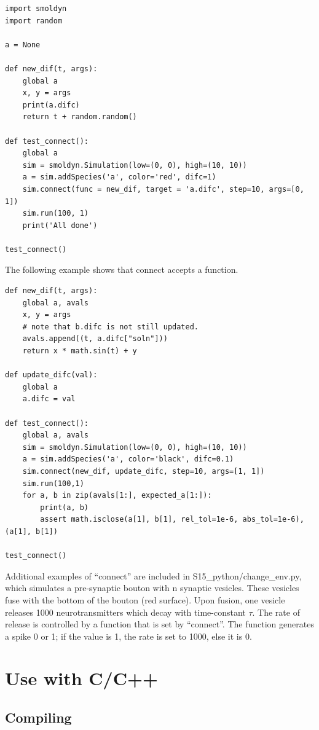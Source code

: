 \documentclass {scrbook}
\begin{document}
\begin{lstlisting}[style=SSAPython]
import smoldyn
import random

a = None

def new_dif(t, args):
    global a
    x, y = args
    print(a.difc)
    return t + random.random()

def test_connect():
    global a
    sim = smoldyn.Simulation(low=(0, 0), high=(10, 10))
    a = sim.addSpecies('a', color='red', difc=1)
    sim.connect(func = new_dif, target = 'a.difc', step=10, args=[0, 1])
    sim.run(100, 1)
    print('All done')

test_connect()
\end{lstlisting}

The following example shows that connect accepts a function.

\begin{lstlisting}[style=SSAPython]
def new_dif(t, args):
    global a, avals
    x, y = args
    # note that b.difc is not still updated.
    avals.append((t, a.difc["soln"]))
    return x * math.sin(t) + y

def update_difc(val):
    global a
    a.difc = val

def test_connect():
    global a, avals
    sim = smoldyn.Simulation(low=(0, 0), high=(10, 10))
    a = sim.addSpecies('a', color='black', difc=0.1)
    sim.connect(new_dif, update_difc, step=10, args=[1, 1])
    sim.run(100,1)
    for a, b in zip(avals[1:], expected_a[1:]):
        print(a, b)
        assert math.isclose(a[1], b[1], rel_tol=1e-6, abs_tol=1e-6), (a[1], b[1])

test_connect()
\end{lstlisting}

Additional examples of ``connect'' are included in S15\_python/change\_env.py, which simulates a pre-synaptic bouton with n synaptic vesicles. These vesicles fuse with the bottom of the bouton (red surface). Upon fusion, one vesicle releases 1000 neurotransmitters which decay with time-constant $\tau$. The rate of release is controlled by a function that is set by ``connect''. The function generates a spike 0 or 1; if the value is 1, the rate is set to 1000, else it is 0.


\section{Use with C/C++}

\subsection*{Compiling}
\end{document}
